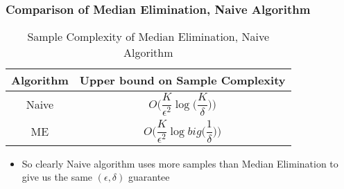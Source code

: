 \begin{frame}
\frametitle{Comparison of Median Elimination, Naive Algorithm}

\begin{table}
\caption{Sample Complexity of Median Elimination, Naive Algorithm}
\begin{center}
\begin{tabular}{|c|c|}
\toprule
Algorithm  & Upper bound on Sample Complexity \\
\midrule
Naive        &$O\bigg(\dfrac{K}{\epsilon^2}\log \big( \dfrac{K}{\delta} \big) \bigg)$ \\\midrule
ME      &$O\bigg(\dfrac{K}{\epsilon^2}\log big( \dfrac{1}{\delta} \big)  \bigg)$\\\bottomrule
\end{tabular}
\end{center}
\end{table}

\begin{itemize}
\item<1-> So clearly Naive algorithm uses more samples than Median Elimination to give us the same $(\epsilon,\delta)$ guarantee
\end{itemize}

\end{frame}

